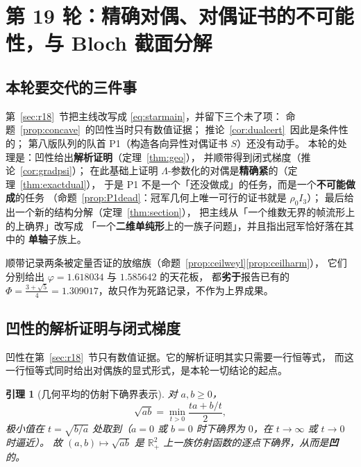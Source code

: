 \documentclass[UTF8,11pt]{ctexart}
\newtheorem{lemma}[theorem]{引理}
\theoremstyle{definition}
\newcommand{\Lam}{\Lambda}
\newcommand{\R}{\mathbb{R}}
\begin{document}
\section{第 19 轮：精确对偶、对偶证书的不可能性，与 Bloch 截面分解}\label{sec:r19}

\subsection{本轮要交代的三件事}\label{sec:r19:motiv}

第~\ref{sec:r18}~节把主线改写成 \eqref{eq:starmain}，并留下三个未了项：
命题~\ref{prop:concave}~的凹性当时只有数值证据；
推论~\ref{cor:dualcert}~因此是条件性的；
第八版队列的队首 P1（构造各向异性对偶证书 $S$）还没有动手。
本轮的处理是：凹性给出\textbf{解析证明}（定理~\ref{thm:geo}），
并顺带得到闭式梯度（推论~\ref{cor:gradpsi}）；
在此基础上证明 $\Lam$-参数化的对偶是\textbf{精确紧}的（定理~\ref{thm:exactdual}），
于是 P1 不是一个「还没做成」的任务，而是一个\textbf{不可能做成}的任务
（命题~\ref{prop:P1dead}：冠军几何上唯一可行的证书就是 $\rho_0I_3$）；
最后给出一个新的结构分解（定理~\ref{thm:section}），
把主线从「一个维数无界的帧流形上的上确界」改写成
「一个\textbf{二维单纯形}上的一族子问题」，并且指出冠军恰好落在其中的
\textbf{单轴}子族上。

顺带记录两条被定量否证的放缩族（命题~\ref{prop:ceilweyl}\ref{prop:ceilharm}），
它们分别给出 $\varphi=1.618034$ 与 $1.585642$ 的天花板，
都\textbf{劣于}报告已有的 $\Phi=\frac{3+\sqrt5}4=1.309017$，故只作为死路记录，不作为上界成果。

\subsection{凹性的解析证明与闭式梯度}\label{sec:r19:conc}

凹性在第~\ref{sec:r18}~节只有数值证据。它的解析证明其实只需要一行恒等式，
而这一行恒等式同时给出对偶族的显式形式，是本轮一切结论的起点。

\begin{lemma}[几何平均的仿射下确界表示]\label{lem:geo}
对 $a,b\ge0$，
\begin{equation}\label{eq:geoam}
\sqrt{ab}=\min_{t>0}\frac{ta+b/t}{2},
\end{equation}
极小值在 $t=\sqrt{b/a}$ 处取到（$a=0$ 或 $b=0$ 时下确界为 $0$，在 $t\to\infty$ 或 $t\to0$ 时逼近）。
故 $(a,b)\mapsto\sqrt{ab}$ 是 $\R_+^2$ 上一族仿射函数的逐点下确界，从而是\textbf{凹}的。
\end{lemma}
\end{document}
